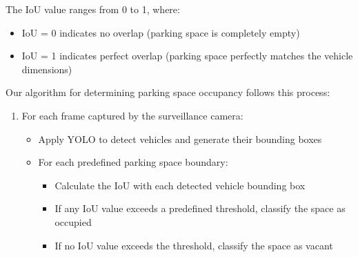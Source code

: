 The IoU value ranges from 0 to 1, where:
\begin{itemize}
    \item IoU = 0 indicates no overlap (parking space is completely empty)
    \item IoU = 1 indicates perfect overlap (parking space perfectly matches the vehicle dimensions)
\end{itemize}

Our algorithm for determining parking space occupancy follows this process:

\begin{enumerate}
    \item For each frame captured by the surveillance camera:
    \begin{itemize}
        \item Apply YOLO to detect vehicles and generate their bounding boxes
        \item For each predefined parking space boundary:
        \begin{itemize}
            \item Calculate the IoU with each detected vehicle bounding box
            \item If any IoU value exceeds a predefined threshold, classify the space as occupied
            \item If no IoU value exceeds the threshold, classify the space as vacant
        \end{itemize}
    \end{itemize}
    
\end{enumerate}
